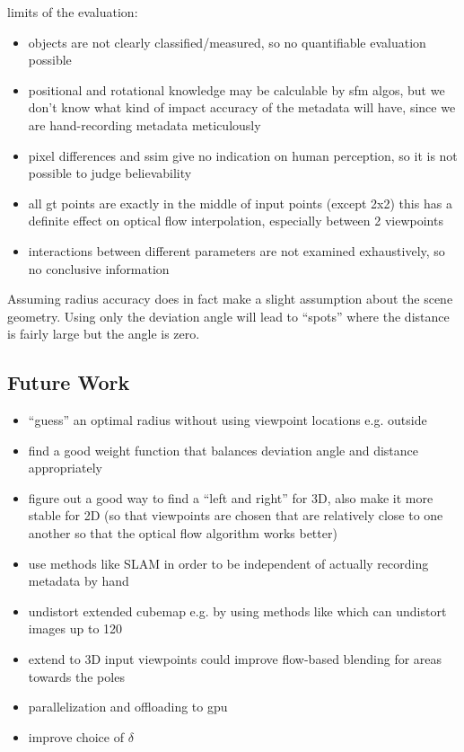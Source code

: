 limits of the evaluation:
\begin{itemize}
  \item objects are not clearly classified/measured, so no quantifiable evaluation possible
  \item positional and rotational knowledge may be calculable by sfm algos, but we don't know what kind of impact accuracy of the metadata will have, since we are hand-recording metadata meticulously
  \item pixel differences and ssim give no indication on human perception, so it is not possible to judge believability
  \item all gt points are exactly in the middle of input points (except 2x2) this has a definite effect on optical flow interpolation, especially between 2 viewpoints
  \item interactions between different parameters are not examined exhaustively, so no conclusive information
\end{itemize}

Assuming radius accuracy does in fact make a slight assumption about the scene geometry. Using only the deviation angle will lead to ``spots'' where the distance is fairly large but the angle is zero. 

\subsection{Future Work}
\begin{itemize}
  \item ``guess'' an optimal radius without using viewpoint locations e.g. outside
  \item find a good weight function that balances deviation angle and distance appropriately
  \item figure out a good way to find a ``left and right'' for 3D, also make it more stable for 2D (so that viewpoints are chosen that are relatively close to one another so that the optical flow algorithm works better)
  \item use methods like SLAM in order to be independent of actually recording metadata by hand
  \item undistort extended cubemap e.g. by using methods like \cite{fov} which can undistort images up to 120\degree
  \item extend to 3D \ar input viewpoints could improve flow-based blending for areas towards the poles
  \item parallelization and offloading to gpu
  \item improve choice of $\delta$
\end{itemize}

